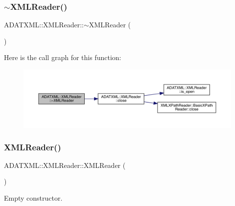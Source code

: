 \subsubsection{\texorpdfstring{$\sim$XMLReader()}{~XMLReader()}\hspace{0.1cm}{\footnotesize\ttfamily [2/3]}}
{\footnotesize\ttfamily A\+D\+A\+T\+X\+M\+L\+::\+X\+M\+L\+Reader\+::$\sim$\+X\+M\+L\+Reader (\begin{DoxyParamCaption}{ }\end{DoxyParamCaption})\hspace{0.3cm}{\ttfamily [inline]}}

Here is the call graph for this function\+:
\nopagebreak
\begin{figure}[H]
\begin{center}
\leavevmode
\includegraphics[width=350pt]{db/d3f/classADATXML_1_1XMLReader_a98c4936a3366f39443113290b7bd164a_cgraph}
\end{center}
\end{figure}
\mbox{\label{classADATXML_1_1XMLReader_a1934189445871612ae9b93f35e17c468}} 
\subsubsection{\texorpdfstring{XMLReader()}{XMLReader()}\hspace{0.1cm}{\footnotesize\ttfamily [11/15]}}
{\footnotesize\ttfamily A\+D\+A\+T\+X\+M\+L\+::\+X\+M\+L\+Reader\+::\+X\+M\+L\+Reader (\begin{DoxyParamCaption}{ }\end{DoxyParamCaption})\hspace{0.3cm}{\ttfamily [inline]}}



Empty constructor. 

\mbox{\label{classADATXML_1_1XMLReader_a85d8af8a27febdd66251e20bd96ccc32}} 
